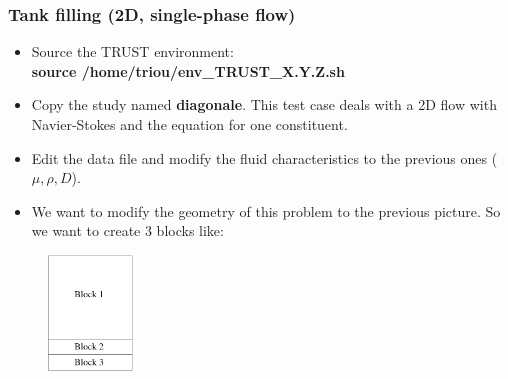 \documentclass[10pt, hyperref={unicode=true,pdfusetitle, bookmarks=true,bookmarksnumbered=false,bookmarksopen=false, breaklinks=false,pdfborder={0 0 1},backref=true,colorlinks=true,linkcolor=darkblue,pageanchor}]{beamer}
\begin{document}
\begin{frame}
\frametitle{Tank filling (2D, single-phase flow)}
\begin{block}{}

\begin{itemize}
\item Source the TRUST environment:\\
\textbf{source /home/triou/env\_TRUST\_X.Y.Z.sh}
\item Copy the study named \textbf{diagonale}. This test case deals with a 2D flow with Navier-Stokes and the equation for one constituent.
\item Edit the data file and modify the fluid characteristics to the previous ones ($\mu, \rho, D$).
\item We want to modify the geometry of this problem to the previous picture. So we want to create 3 blocks like:
\end{itemize}

\begin{figure}
\includegraphics[width=0.2\textwidth]{PICTURES/tank2D_2.pdf}
\end{figure}

\end{block}
\end{frame}
\end{document}
